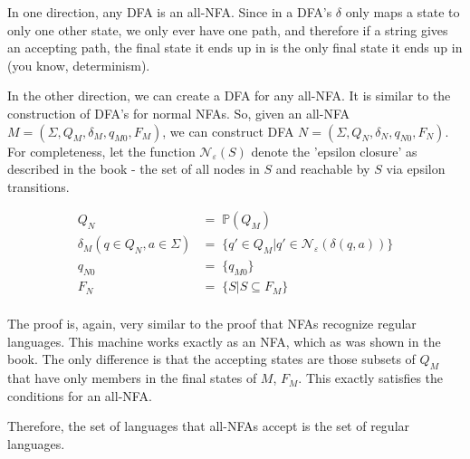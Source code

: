 \documentclass[english]{article}
\begin{document}
In one direction, any DFA is an all-NFA. Since in a DFA's $\delta$ only maps a state to only one other state, we only ever have one path, and therefore if a string gives an accepting path, the final state it ends up in is the only final state it ends up in (you know, determinism).

In the other direction, we can create a DFA for any all-NFA. It is similar to the construction of DFA's for normal NFAs. So, given an all-NFA $M = (\Sigma,Q_M,\delta_M,q_{M0},F_M)$, we can construct DFA $N = (\Sigma,Q_N,\delta_N,q_{N0},F_N)$. For completeness, let the function $\mathcal{N}_\varepsilon(S)$ denote the 'epsilon closure' as described in the book - the set of all nodes in $S$ and reachable by $S$ via epsilon transitions.

\begin{align*}
                              Q_N &=\; \mathbb{P}(Q_M) \\
 \delta_M(q \in Q_N,a \in \Sigma) &=\; \{ q' \in Q_M | q' \in \mathcal{N}_\varepsilon(\delta(q,a)) \} \\
                           q_{N0} &=\; \{q_{M0}\} \\
                              F_N &=\; \{ S | S \subseteq F_M \} \\
\end{align*}

The proof is, again, very similar to the proof that NFAs recognize regular languages. This machine works exactly as an NFA, which as was shown in the book. The only difference is that the accepting states are those subsets of $Q_M$ that have only members in the final states of $M$, $F_M$. This exactly satisfies the conditions for an all-NFA.

Therefore, the set of languages that all-NFAs accept is the set of regular languages.
\end{document}
